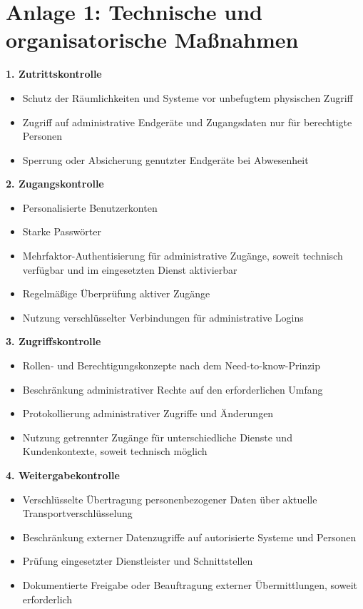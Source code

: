 \documentclass[11pt,a4paper]{article}
\begin{document}
\section*{Anlage 1: Technische und organisatorische Maßnahmen}
\textbf{1. Zutrittskontrolle}
\begin{itemize}
  \item Schutz der Räumlichkeiten und Systeme vor unbefugtem physischen Zugriff
  \item Zugriff auf administrative Endgeräte und Zugangsdaten nur für berechtigte Personen
  \item Sperrung oder Absicherung genutzter Endgeräte bei Abwesenheit
\end{itemize}

\textbf{2. Zugangskontrolle}
\begin{itemize}
  \item Personalisierte Benutzerkonten
  \item Starke Passwörter
  \item Mehrfaktor-Authentisierung für administrative Zugänge, soweit technisch verfügbar und im eingesetzten Dienst aktivierbar
  \item Regelmäßige Überprüfung aktiver Zugänge
  \item Nutzung verschlüsselter Verbindungen für administrative Logins
\end{itemize}

\textbf{3. Zugriffskontrolle}
\begin{itemize}
  \item Rollen- und Berechtigungskonzepte nach dem Need-to-know-Prinzip
  \item Beschränkung administrativer Rechte auf den erforderlichen Umfang
  \item Protokollierung administrativer Zugriffe und Änderungen
  \item Nutzung getrennter Zugänge für unterschiedliche Dienste und Kundenkontexte, soweit technisch möglich
\end{itemize}

\textbf{4. Weitergabekontrolle}
\begin{itemize}
  \item Verschlüsselte Übertragung personenbezogener Daten über aktuelle Transportverschlüsselung
  \item Beschränkung externer Datenzugriffe auf autorisierte Systeme und Personen
  \item Prüfung eingesetzter Dienstleister und Schnittstellen
  \item Dokumentierte Freigabe oder Beauftragung externer Übermittlungen, soweit erforderlich
\end{itemize}
\end{document}
